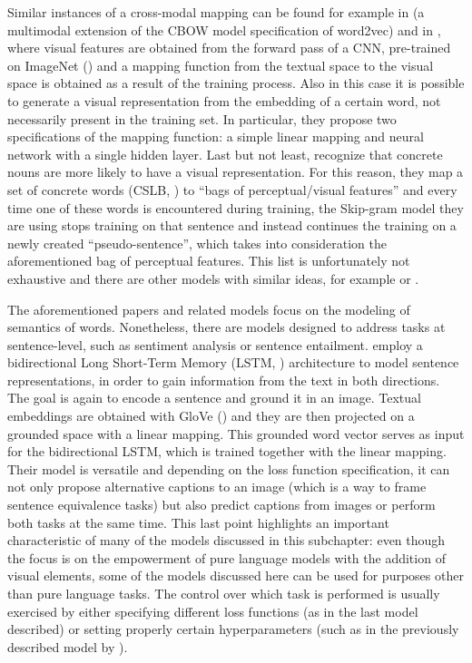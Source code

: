 \documentclass[
]{krantz}
\begin{document}
Similar instances of a cross-modal mapping can be found for example in \citet{kottur2016visual} (a multimodal extension of the CBOW model specification of word2vec) and in \citet{collell2017imagined}, where visual features are obtained from the forward pass of a CNN, pre-trained on ImageNet (\citet{deng2009imagenet}) and a mapping function from the textual space to the visual space is obtained as a result of the training process. Also in this case it is possible to generate a visual representation from the embedding of a certain word, not necessarily present in the training set. In particular, they propose two specifications of the mapping function: a simple linear mapping and neural network with a single hidden layer. Last but not least, \citet{hill2014learning} recognize that concrete nouns are more likely to have a visual representation. For this reason, they map a set of concrete words (CSLB, \citet{devereux2014centre}) to ``bags of perceptual/visual features'' and every time one of these words is encountered during training, the Skip-gram model they are using stops training on that sentence and instead continues the training on a newly created ``pseudo-sentence'', which takes into consideration the aforementioned bag of perceptual features. This list is unfortunately not exhaustive and there are other models with similar ideas, for example \citet{ailem2018probabilistic} or \citet{kiros2018illustrative}.

The aforementioned papers and related models focus on the modeling of semantics of words. Nonetheless, there are models designed to address tasks at sentence-level, such as sentiment analysis or sentence entailment. \citet{kiela2017learning} employ a bidirectional Long Short-Term Memory (LSTM, \citet{hochreiter1997long}) architecture to model sentence representations, in order to gain information from the text in both directions. The goal is again to encode a sentence and ground it in an image. Textual embeddings are obtained with GloVe (\citet{pennington2014glove}) and they are then projected on a grounded space with a linear mapping. This grounded word vector serves as input for the bidirectional LSTM, which is trained together with the linear mapping. Their model is versatile and depending on the loss function specification, it can not only propose alternative captions to an image (which is a way to frame sentence equivalence tasks) but also predict captions from images or perform both tasks at the same time. This last point highlights an important characteristic of many of the models discussed in this subchapter: even though the focus is on the empowerment of pure language models with the addition of visual elements, some of the models discussed here can be used for purposes other than pure language tasks. The control over which task is performed is usually exercised by either specifying different loss functions (as in the last model described) or setting properly certain hyperparameters (such as in the previously described model by \citet{silberer2014learning}).
\end{document}
